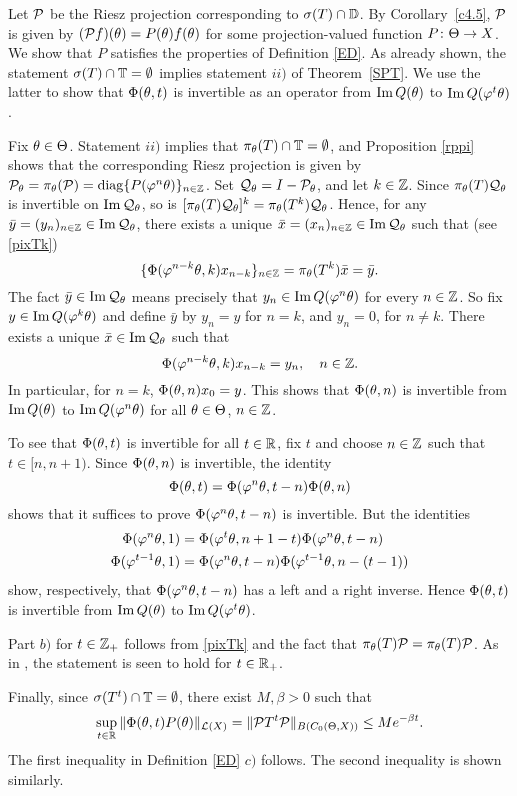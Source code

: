 \begin{pf}  Let ${\cal{P}}$ be the Riesz projection corresponding to
$\sigma(T)\cap{\Bbb{D}}$.  By Corollary~\ref{c4.5}, ${\cal{P}}$ is
 given by $({\cal{P}} f)(\theta)=P(\theta)f(\theta)$ for some
projection-valued function $P\colon \Theta\to X$.
We show that $P$ satisfies the properties of Definition \ref{ED}.
As already  shown, the statement $\sigma(T)\cap{\Bbb{T}}
= \emptyset$ implies statement $ii)$ of
Theorem~\ref{SPT}.  We use the latter to show that $\Phi(\theta,t)$ is
invertible as an operator from $\operatorname{Im} Q(\theta)$ to $\operatorname{Im} Q(\varphi^t\theta)$.

Fix $\theta\in \Theta$.  Statement $ii)$ implies that
$\pi_\theta(T)\cap{\Bbb{T}}=\emptyset$, and Proposition \ref{rppi} shows that
the corresponding Riesz projection is given by
${\cal{P}}_\theta=\pi_\theta({\cal{P}})= \operatorname{diag}\{P(\varphi^n\theta)\}_{n\in{\Bbb{Z}}}$.  Set
${\cal{Q}}_\theta=I-{\cal{P}}_\theta$, and let $k\in{\Bbb{Z}}$.  Since
$\pi_\theta(T){\cal{Q}}_\theta$ is invertible on $\operatorname{Im}{\cal{Q}}_\theta$, so is
$[\pi_\theta(T){\cal{Q}}_\theta]^k=\pi_\theta(T^k){\cal{Q}}_\theta$.
Hence, for any $\bar y=(y_n)_{n\in{\Bbb{Z}}}\in\operatorname{Im}{\cal{Q}}_\theta$,
there exists a unique $\bar x=(x_n)_{n\in{\Bbb{Z}}}\in\operatorname{Im}{\cal{Q}}_\theta$
such that (see \eqref{pixTk})
$$
\{\Phi(\varphi^{n-k}\theta,k)x_{n-k}\}_{n\in{\Bbb{Z}}}=
\pi_\theta(T^k)\bar x=\bar y.
$$
The fact $\bar y\in\operatorname{Im}{\cal{Q}}_\theta$ means precisely that
$y_n\in\operatorname{Im} Q(\varphi^n\theta)$ for every $n\in{\Bbb{Z}}$.  So fix
$y\in\operatorname{Im} Q(\varphi^k\theta)$ and define $\bar y$ by $y_n=y$
for $n=k$, and $y_n=0$, for $n\ne k$.  There exists a unique
$\bar x\in\operatorname{Im}{\cal{Q}}_\theta$ such that
$$
\Phi(\varphi^{n-k}\theta,k)x_{n-k}=y_n,\quad n\in{\Bbb{Z}}.
$$
In particular, for $n=k$, $\Phi(\theta,n)x_0=y$.  This shows that
$\Phi(\theta,n)$ is invertible from $\operatorname{Im} Q(\theta)$ to $\operatorname{Im} Q(\varphi^n\theta)$ for
all $\theta\in \Theta$, $n\in{\Bbb{Z}}$.

To see that $\Phi(\theta,t)$ is invertible for all $t\in{\Bbb{R}}$, fix $t$
and choose $n\in{\Bbb{Z}}$ such that $t\in[n,n+1)$.  Since
$\Phi(\theta,n)$ is invertible, the identity
$$
\Phi(\theta,t)=\Phi(\varphi^n\theta,t-n)\Phi(\theta,n)
$$
shows that it suffices to prove $\Phi(\varphi^n\theta,t-n)$ is invertible.
But the identities
$$\begin{aligned}
\Phi(\varphi^n\theta,1)&=\Phi(\varphi^t\theta,n+1-t)\Phi(\varphi^n\theta,t-n)\\
\Phi(\varphi^{t-1}\theta,1)&=\Phi(\varphi^n\theta,t-n)\Phi(\varphi^{t-1}\theta,n-(t-1))
\end{aligned}$$
show, respectively, that $\Phi(\varphi^n\theta,t-n)$ has a left and a
right inverse.  Hence $\Phi(\theta,t)$ is invertible from $\operatorname{Im} Q(\theta)$ to
$\operatorname{Im} Q(\varphi^t\theta)$.

Part $b)$ for $t\in{\Bbb{Z}}_+$ follows from \eqref{pixTk} and the fact
that $\pi_\theta(T){\cal{P}}=\pi_\theta(T){\cal{P}}$. As in \cite[Prop.~3.10]{LS}, the
statement is seen to hold  for $t\in{\Bbb{R}}_+$.

Finally, since
$\sigma(T^t)\cap {\Bbb{T}}=\emptyset$, there
exist $M,\beta>0$ such that
\[ \sup_{t\in{\Bbb{R}}}\|\Phi(\theta,t) P(\theta)\|_{{\cal{L}}(X)}
=\|{\cal{P}} T^t{\cal{P}}\|_{B(C_0(\Theta,X))}\le
Me^{-\beta t}.\]  The first inequality in Definition \ref{ED} $c)$
follows. The second inequality is shown similarly.
\end{pf}

